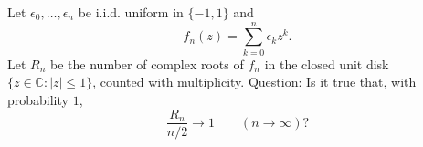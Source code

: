 Let $\epsilon_0,\dots,\epsilon_n$ be i.i.d. uniform in $\{-1,1\}$ and
\[f_n(z)=\sum_{k=0}^n \epsilon_k z^k.
\]
Let $R_n$ be the number of complex roots of $f_n$ in the closed unit disk $\{z\in\mathbb C:|z|\le 1\}$, counted with multiplicity.
Question: Is it true that, with probability $1$,
\[\frac{R_n}{n/2}\to 1\qquad (n\to\infty)?
\]
